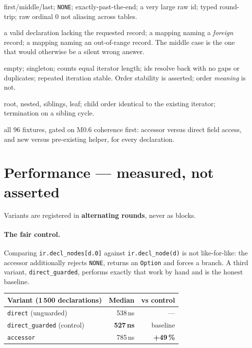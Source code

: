 \documentclass[11pt,a4paper]{article}
\newcommand{\code}[1]{\texttt{#1}}
\begin{document}
\begin{description}\itemsep3pt
\item[Lookup] first/middle/last; \code{NONE}; exactly-past-the-end; a very large
  raw id; typed round-trip; raw ordinal 0 not aliasing across tables.
\item[Absence] a valid declaration lacking the requested record; a mapping
  naming a \emph{foreign} record; a mapping naming an out-of-range record. The
  middle case is the one that would otherwise be a silent wrong answer.
\item[Iteration] empty; singleton; counts equal iterator length; ids resolve
  back with no gaps or duplicates; repeated iteration stable. Order stability is
  asserted; order \emph{meaning} is not.
\item[Hierarchy] root, nested, siblings, leaf; child order identical to the
  existing iterator; termination on a sibling cycle.
\item[Compatibility] all 96 fixtures, gated on M0.6 coherence first: accessor
  versus direct field access, and new versus pre-existing helper, for every
  declaration.
\end{description}

\section{Performance --- measured, not asserted}

Variants are registered in \textbf{alternating rounds}, never as blocks.

\paragraph{The fair control.} Comparing \code{ir.decl\_nodes[d.0]} against
\code{ir.decl\_node(d)} is not like-for-like: the accessor additionally rejects
\code{NONE}, returns an \code{Option} and forces a branch. A third variant,
\code{direct\_guarded}, performs exactly that work by hand and is the honest
baseline.

\begin{center}
\begin{tabular}{@{}lrr@{}}
\toprule
\textbf{Variant (1\,500 declarations)} & \textbf{Median} & \textbf{vs control} \\
\midrule
\code{direct} (unguarded) & 538\,ns & --- \\
\code{direct\_guarded} (control) & \textbf{527\,ns} & baseline \\
\code{accessor} & 785\,ns & \textbf{+49\,\%} \\
\bottomrule
\end{tabular}
\end{center}
\end{document}
